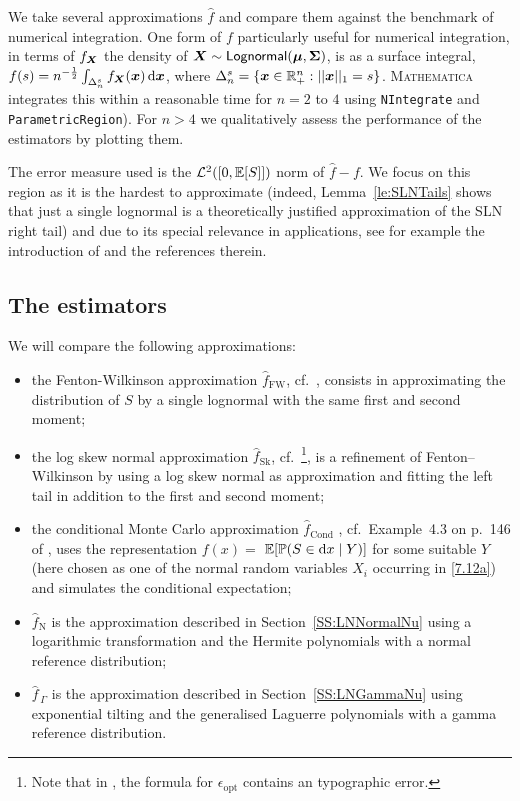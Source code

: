 We take several approximations $\widehat{f}$ and compare them against the benchmark of numerical integration.
One form of $f$ particularly useful for numerical integration, in terms of $f_{\bm{X}}$ the density of $\bm{X} \sim \mathsf{Lognormal}(\bm{\mu}, \bm{\Sigma})$, is as a surface integral,
$ f(s) = n^{-\frac12} \int_{\Delta_n^s} f_{\bm{X}}(\bm{x}) \mathop{}\!\mathrm{d} \bm{x} $,
where $\Delta_n^s = \{ \bm{x} \in \mathbb{R}_+^n : ||\bm{x}||_1 = s \}$. \textsc{Mathematica} integrates this within a reasonable time for $n=2$ to $4$ using \texttt{NIntegrate} and \texttt{ParametricRegion}). For $n > 4$ we qualitatively assess the performance of the estimators by plotting them.

The error measure used is the $\mathcal{L}^2([0, \operatorname{{\mathbb E}}[S]])$ norm of $\widehat{f}-f$. We focus on this region as
it is the hardest to approximate (indeed, Lemma~\ref{le:SLNTails} shows that just a single lognormal is a theoretically justified approximation of the SLN right tail) and due to its special relevance in applications, see for example the introduction of \cite {asmussen2015exponential} and the references therein.


\subsection{The estimators}
We will compare the following approximations:
\begin{itemize}
\item the Fenton-Wilkinson approximation $\widehat{f}_{\mathrm{FW}}$, cf.\ \cite{fenton1960sum}, consists in approximating the distribution of $S$ by a single lognormal
with the same first and second moment;
\item the log skew normal approximation $\widehat{f}_{\mathrm{Sk}}$,
cf.\ \cite{hcine2015highly}\footnote{Note that in \cite{hcine2015highly}, the formula for $\epsilon_{\mathrm{opt}}$ contains an typographic error.}, is a refinement of Fenton--Wilkinson by using a log  skew normal as approximation and fitting the left tail in addition to the first and second moment;
\item the conditional Monte Carlo approximation $\widehat{f}_{\mathrm{Cond}}$ , cf.\ Example~4.3 on p.\ 146 of \cite{asmussen2007stochastic}, uses the representation $f(x)=$
$\operatorname{{\mathbb E}}[\operatorname{{\mathbb P}}(S\in\mathop{}\!\mathrm{d} x \mid Y)]$ for some suitable $Y$ (here chosen as one of the
normal random variables $X_i$ occurring in \eqref{7.12a}) and simulates the conditional expectation;
\item $\widehat{f}_{\mathrm{N}}$ is the approximation described in Section~\ref{SS:LNNormalNu} using a logarithmic transformation
and the Hermite polynomials with a normal reference distribution;
\item $\widehat{f}_{\,\Gamma}$ is the approximation described in Section~\ref{SS:LNGammaNu} using exponential tilting and the generalised Laguerre polynomials with a gamma reference distribution.
\end{itemize}

